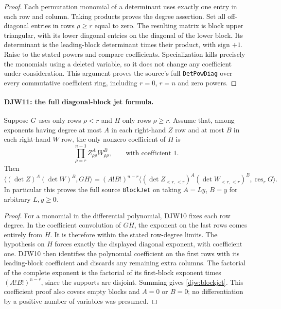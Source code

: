 \documentclass[11pt,a4paper]{article}
\numberwithin{equation}{section}
\theoremstyle{remark}\newtheorem{remark}[theorem]{Remark}
\begin{document}
\begin{proof}
Each permutation monomial of a determinant uses exactly one entry
in each row and column.  Taking products proves the degree assertion.
Set all off-diagonal entries in rows $\rho\ge r$ equal to zero.
The resulting matrix is block upper triangular, with its lower
diagonal entries on the diagonal of the lower block.  Its determinant
is the leading-block determinant times their product, with sign $+1$.
Raise to the stated powers and compare coefficients.
Specialization kills precisely the monomials using a deleted variable,
so it does not change any coefficient under consideration.  This
argument proves the source's full \texttt{Det\allowbreak Pow\allowbreak Diag} over every
commutative coefficient ring, including $r=0$, $r=n$ and zero powers.
\end{proof}

\paragraph{DJW11: the full diagonal-block jet formula.}
\label{claim:DJW11}
Suppose $G$ uses only rows $\rho<r$ and $H$ only rows $\rho\ge r$.
Assume that, among exponents having degree at most $A$ in each
right-hand $Z$ row and at most $B$ in each right-hand $W$ row,
the only nonzero coefficient of $H$ is
\[
 \prod_{\rho=r}^{n-1}Z_{\rho\rho}^{A}W_{\rho\rho}^{B},
 \qquad\text{with coefficient }1.
\]
Then
\begin{equation}
 \langle(\det Z)^A(\det W)^B,GH\rangle
  =(A!B!)^{n-r}
    \langle(\det Z_{<r,<r})^A(\det W_{<r,<r})^B,
                \operatorname{res}_rG\rangle.
 \label{djw:blockjet}
\end{equation}
In particular this proves the full source \texttt{Block\allowbreak Jet} on taking
$A=Ly$, $B=y$ for arbitrary $L,y\ge0$.

\begin{proof}
For a monomial in the differential polynomial, DJW10 fixes each
row degree.  In the coefficient convolution of $GH$, the exponent
on the last rows comes entirely from $H$.  It is therefore within
the stated row-degree limits.  The hypothesis on $H$ forces exactly
the displayed diagonal exponent, with coefficient one.
DJW10 then identifies the polynomial coefficient on the first rows
with its leading-block coefficient and discards any remaining extra
columns.  The factorial of the complete exponent is the factorial
of its first-block exponent times $(A!B!)^{n-r}$, since the supports
are disjoint.  Summing gives \eqref{djw:blockjet}.
This coefficient proof also covers empty blocks and $A=0$ or $B=0$;
no differentiation by a positive number of variables was presumed.
\end{proof}
\end{document}
